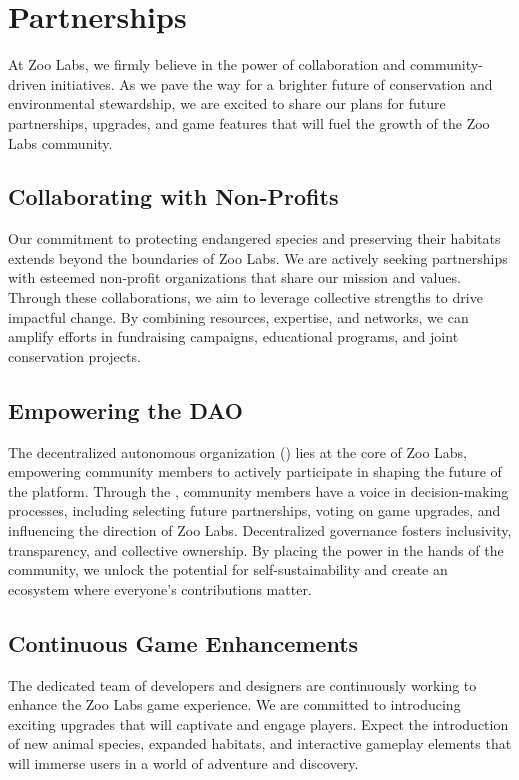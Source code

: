 \section{Partnerships}

At Zoo Labs, we firmly believe in the power of collaboration and community-driven initiatives. As we pave the way for a brighter future of conservation and environmental stewardship, we are excited to share our plans for future partnerships, upgrades, and game features that will fuel the growth of the Zoo Labs community.

\subsection{Collaborating with Non-Profits}
Our commitment to protecting endangered species and preserving their habitats extends beyond the boundaries of Zoo Labs. We are actively seeking partnerships with esteemed non-profit organizations that share our mission and values. Through these collaborations, we aim to leverage collective strengths to drive impactful change. By combining resources, expertise, and networks, we can amplify efforts in fundraising campaigns, educational programs, and joint conservation projects.

\subsection{Empowering the DAO}
The decentralized autonomous organization (\DAO{}) lies at the core of Zoo Labs, empowering community members to actively participate in shaping the future of the platform. Through the \DAO{}, community members have a voice in decision-making processes, including selecting future partnerships, voting on game upgrades, and influencing the direction of Zoo Labs. Decentralized governance fosters inclusivity, transparency, and collective ownership. By placing the power in the hands of the community, we unlock the potential for self-sustainability and create an ecosystem where everyone's contributions matter.

\subsection{Continuous Game Enhancements}
The dedicated team of developers and designers are continuously working to enhance the Zoo Labs game experience. We are committed to introducing exciting upgrades that will captivate and engage players. Expect the introduction of new animal species, expanded habitats, and interactive gameplay elements that will immerse users in a world of adventure and discovery.

